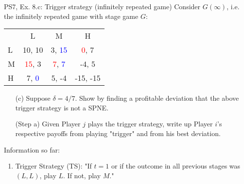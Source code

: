 \begin{frame}{PS7, Ex. 8.c: Trigger strategy (infinitely repeated game)}
    Consider $G(\infty)$, i.e. the infinitely repeated game with stage game $G$: \vspace{-6pt}
    \begin{table}
      \begin{tabular}{l|c|c|c|}
        \multicolumn{1}{c}{} & \multicolumn{1}{c}{L} & \multicolumn{1}{c}{M} & \multicolumn{1}{c}{H} \\\cline{2-4}
        L & 10, 10 & 3, \textcolor{blue}{15} & \textcolor{red}{0}, 7 \\\cline{2-4}
        M & \textcolor{red}{15}, 3 & \textcolor{red}{7}, \textcolor{blue}{7} & -4, 5 \\\cline{2-4}
        H & 7, \textcolor{blue}{0} & 5, -4 & -15, -15 \\\cline{2-4}
      \end{tabular}
    \end{table}
    \begin{itemize}
      \vspace{-4pt} \item[(c)] Suppose $\delta = 4/7$. Show by finding a profitable deviation that the above trigger strategy is not a SPNE. \vspace{-6pt}
    \end{itemize}
  \begin{multicols}{2}
    \begin{itemize}
      \item[(Step a)] Given Player $j$ plays the trigger strategy, write up Player $i$'s respective payoffs from playing "trigger" and from his best deviation.
    \end{itemize}
    \vfill\null\columnbreak
    Information so far:
    \begin{enumerate}
      \item Trigger Strategy (TS): "If $t=1$ or if the outcome in all previous stages was $(L,L)$, play $L$. If not, play $M$."
    \end{enumerate}
    \vfill\null
  \end{multicols}
\end{frame}
